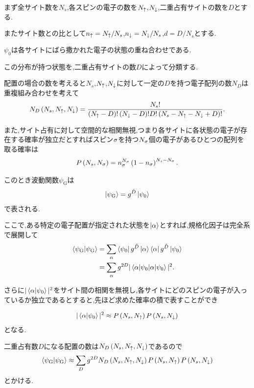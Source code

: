 まず全サイト数を\(N_{s}\),各スピンの電子の数を\(N_{\uparrow}\),\(N_{\downarrow}\),二重占有サイトの数を\(D\)とする.

またサイト数との比として\(n_{\uparrow}=N_{\uparrow}/N_{s}\),\(n_{\downarrow}=N_{\downarrow}/N_{s}\),\(d=D/N_{s}\)とする.

\(\psi_{0}\)は各サイトにばら撒かれた電子の状態の重ね合わせである.

この分布が持つ状態を,二重占有サイトの数\(D\)によって分類する.

配置の場合の数を考えると\(N_{s}\),\(N_{\uparrow}\),\(N_{\downarrow}\)に対して一定の\(D\)を持つ電子配列の数\(N_{D}\)は重複組み合わせを考えて
\begin{equation}
    N_{D}\left( N_{s},N_{\uparrow},N_{\downarrow} \right)=\frac{N_{s}!}{\left( N_{\uparrow}-D \right)!\left( N_{\downarrow}-D \right)!D!\left( N_{s}-N_{\uparrow}-N_{\downarrow}+D \right)!}.\label{eq:ND}
\end{equation}

また,サイト占有に対して空間的な相関無視,つまり各サイトに各状態の電子が存在する確率が独立だとすればスピン\(\sigma\)を持つ\(N_{\sigma}\)個の電子があるひとつの配列を取る確率は
\begin{equation}
    P\left( N_{s},N_{\sigma} \right)=n_{\sigma}^{N_{\sigma}}\left( 1-n_{\sigma} \right)^{N_{s}-N_{\sigma}}.\label{eq:prob}
\end{equation}

このとき波動関数\(\psi_{\text{G}}\)は
\begin{equation}
    \ket{\psi_{\text{G}}}=g^{\hat{D}}\ket{\psi_{0}}
\end{equation}
で表される.

ここで,ある特定の電子配置が指定された状態を\(\ket{\alpha}\)とすれば,規格化因子は完全系で展開して
\begin{equation}
\begin{split}
    \braket{\psi_{\text{G}}}&=\sum_{\alpha}\bra{\psi_{0}}g^{\hat{D}}\ket{\alpha}\bra{\alpha}g^{\hat{D}}\ket{\psi_{\text{0}}}\\
    &=\sum_{\alpha}g^{2D}|\braket{\alpha|\psi_{0}}|^2.
\end{split}
\end{equation}

さらに\(|\braket{\alpha}{\psi_{0}}|^2\)をサイト間の相関を無視し,各サイトにどのスピンの電子が入っているか独立であるとすると,先ほど求めた確率の積で表すことができ

\begin{equation}
    |\braket{\alpha}{\psi_{0}}|^2 \approx P\left( N_{s},N_{\uparrow} \right)P\left( N_{s},N_{\downarrow} \right)
\end{equation}
となる.

二重占有数\(D\)になる配置の数は\(N_{D}\left( N_{s},N_{\uparrow},N_{\downarrow} \right)\)であるので
\begin{equation}
    \braket{\psi_{\text{G}}}\approx \sum_{D}g^{2D}N_{D}\left( N_{s},N_{\uparrow},N_{\downarrow} \right)P\left( N_{s},N_{\uparrow} \right)P\left( N_{s},N_{\downarrow} \right)
\end{equation}
とかける.

